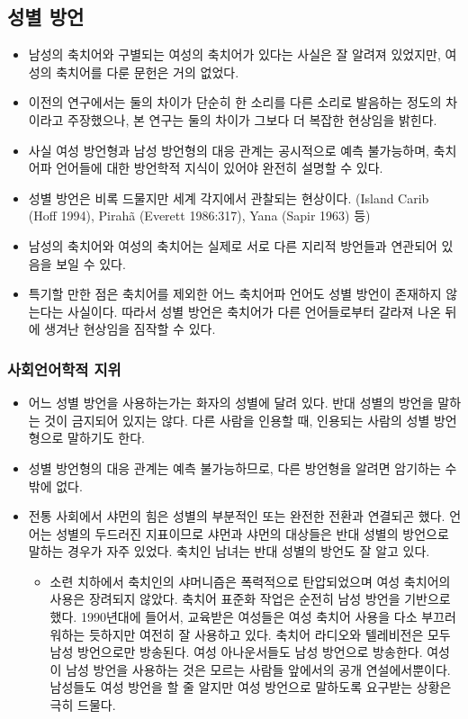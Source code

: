 \subsection{성별 방언}
\begin{itemize}
\item 남성의 축치어와 구별되는 여성의 축치어가 있다는 사실은 잘 알려져 있었지만, 여성의 축치어를 다룬 문헌은 거의 없었다. 
\item 이전의 연구에서는 둘의 차이가 단순히 한 소리를 다른 소리로 발음하는 정도의 차이라고 주장했으나, 본 연구는 둘의 차이가 그보다 더 복잡한 현상임을 밝힌다. 
\item 사실 여성 방언형과 남성 방언형의 대응 관계는 공시적으로 예측 불가능하며, 축치어파 언어들에 대한 방언학적 지식이 있어야 완전히 설명할 수 있다.
\item 성별 방언은 비록 드물지만 세계 각지에서 관찰되는 현상이다. (Island Carib (Hoff 1994), Pirahã (Everett 1986:317), Yana (Sapir 1963) 등)
\item 남성의 축치어와 여성의 축치어는 실제로 서로 다른 지리적 방언들과 연관되어 있음을 보일 수 있다. 
\item 특기할 만한 점은 축치어를 제외한 어느 축치어파 언어도 성별 방언이 존재하지 않는다는 사실이다. 따라서 성별 방언은 축치어가 다른 언어들로부터 갈라져 나온 뒤에 생겨난 현상임을 짐작할 수 있다.
\end{itemize}

\subsubsection{사회언어학적 지위}
\begin{itemize}
\item 어느 성별 방언을 사용하는가는 화자의 성별에 달려 있다. 반대 성별의 방언을 말하는 것이 금지되어 있지는 않다. 다른 사람을 인용할 때, 인용되는 사람의 성별 방언형으로 말하기도 한다. 
\item 성별 방언형의 대응 관계는 예측 불가능하므로, 다른 방언형을 알려면 암기하는 수밖에 없다. 
\item 전통 사회에서 샤먼의 힘은 성별의 부분적인 또는 완전한 전환과 연결되곤 했다. 언어는 성별의 두드러진 지표이므로 샤먼과 샤먼의 대상들은 반대 성별의 방언으로 말하는 경우가 자주 있었다. 축치인 남녀는 반대 성별의 방언도 잘 알고 있다.
\begin{itemize}
\item 소련 치하에서 축치인의 샤머니즘은 폭력적으로 탄압되었으며 여성 축치어의 사용은 장려되지 않았다. 축치어 표준화 작업은 순전히 남성 방언을 기반으로 했다. 1990년대에 들어서, 교육받은 여성들은 여성 축치어 사용을 다소 부끄러워하는 듯하지만 여전히 잘 사용하고 있다. 축치어 라디오와 텔레비전은 모두 남성 방언으로만 방송된다. 여성 아나운서들도 남성 방언으로 방송한다. 여성이 남성 방언을 사용하는 것은 모르는 사람들 앞에서의 공개 연설에서뿐이다. 남성들도 여성 방언을 할 줄 알지만 여성 방언으로 말하도록 요구받는 상황은 극히 드물다.
\end{itemize}
\end{itemize}


